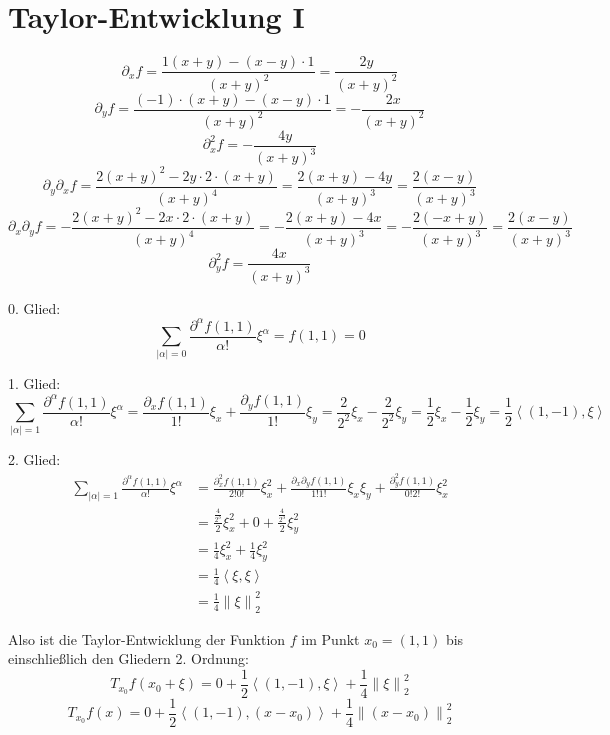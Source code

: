 \documentclass[sectionformat=aufgabe]{gadsescript}
\begin{document}
\maketitle
\section{Taylor-Entwicklung I}
\[
	\partial_x f = \frac{ 1(x + y) - (x - y) \cdot 1 }{ ( x + y)^2 } = \frac{ 2y }{ (x + y)^2 }
\]
\[
	\partial_y f = \frac{ (-1)\cdot (x + y) - (x - y)\cdot 1 }{ ( x + y)^2 } = - \frac{ 2x }{ (x + y)^2 }
\]
\[
	\partial_x^2 f = - \frac{4y}{ (x + y)^3 } 
\]
\[
	\partial_y \partial_x f = \frac{2(x + y)^2 - 2y \cdot 2 \cdot (x + y)}{ (x + y)^4 } = \frac{ 2(x + y) - 4y }{ (x + y )^3 } = \frac{ 2(x - y) }{ (x + y)^3 } 
\]
\[
	\partial_x \partial_y f = - \frac{2(x + y)^2 - 2x \cdot 2 \cdot (x + y)}{ (x + y)^4 } = -\frac{ 2(x + y) - 4x }{ (x + y )^3 } = -\frac{ 2(-x + y) }{ (x + y)^3 } = \frac{ 2(x - y) }{ ( x + y )^3 } 
\]
\[
	\partial_y^2 f = \frac{4x}{ (x + y)^3 } 
\]


0. Glied:
\[
	\sum_{\left| \alpha \right| = 0}^{} \frac{ \partial^{\alpha} f(1, 1) }{ \alpha! } \xi^{\alpha} = f(1, 1) = 0
\]

1. Glied:
\[
	\sum_{\left| \alpha \right| = 1}^{} \frac{ \partial^{\alpha} f(1, 1) }{ \alpha! } \xi^{\alpha}
	= \frac{ \partial_x f(1, 1) }{ 1! } \xi_x
	+ \frac{ \partial_y f(1, 1) }{ 1! } \xi_y
	= \frac{ 2 }{ 2^2 } \xi_x - \frac{2}{ 2^2 } \xi_y = \frac{ 1 }{ 2 } \xi_x - \frac{ 1 }{ 2 } \xi_y = \frac{ 1 }{ 2 } \left< (1, -1), \xi \right>
\]

2. Glied:
\begin{align*}
	\sum_{\left| \alpha \right| = 1}^{} \frac{ \partial^{\alpha} f(1, 1) }{ \alpha! } \xi^{\alpha}
	&= \frac{ \partial_x^2 f(1, 1) }{ 2!0! } \xi_x^2
	+ \frac{ \partial_x \partial_y f(1, 1) }{ 1!1! } \xi_x\xi_y
	+ \frac{ \partial_y^2 f(1, 1) }{ 0!2! } \xi_x^2 \\
	&= \frac{ \frac{ 4 }{ 2^3 } }{ 2 } \xi_x^2 + 0 + \frac{ \frac{ 4 }{ 2^3 } }{ 2 } \xi_y^2 \\
	&= \frac{ 1 }{ 4 } \xi_x^2 + \frac{ 1 }{ 4 } \xi_y^2 \\
	&= \frac{ 1 }{ 4 } \left< \xi, \xi \right> \\
	&= \frac{ 1 }{ 4 } \left\| \xi \right\| _2^2
\end{align*}

Also ist die Taylor-Entwicklung der Funktion $ f $ im Punkt $ x_0 = (1, 1) $ bis einschließlich den Gliedern 2. Ordnung:
\[
	T_{x_0} f(x_0 + \xi) = 0 + \frac{ 1 }{ 2 } \left< (1, -1), \xi \right> + \frac{ 1 }{ 4 } \left\| \xi \right\| _2^2
\]
\[
	T_{x_0} f(x) = 0 + \frac{ 1 }{ 2 } \left< (1, -1), (x - x_0) \right> + \frac{ 1 }{ 4 } \left\| (x - x_0) \right\| _2^2
\]
\end{document}

